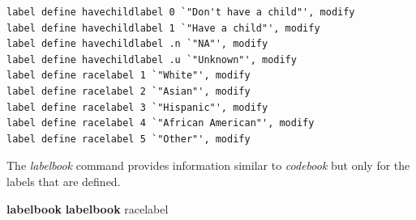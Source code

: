 \documentclass[
]{book}
\newenvironment{Shaded}{\begin{snugshade}}{\end{snugshade}}
\newcommand{\KeywordTok}[1]{\textcolor[rgb]{0.13,0.29,0.53}{\textbf{#1}}}
\newcommand{\NormalTok}[1]{#1}
\begin{document}
\begin{verbatim}
label define havechildlabel 0 `"Don't have a child"', modify
label define havechildlabel 1 `"Have a child"', modify
label define havechildlabel .n `"NA"', modify
label define havechildlabel .u `"Unknown"', modify
label define racelabel 1 `"White"', modify
label define racelabel 2 `"Asian"', modify
label define racelabel 3 `"Hispanic"', modify
label define racelabel 4 `"African American"', modify
label define racelabel 5 `"Other"', modify
\end{verbatim}

The \emph{labelbook} command provides information similar to \emph{codebook} but only for the labels that are defined.

\begin{Shaded}
\begin{Highlighting}[]
\KeywordTok{labelbook}
\KeywordTok{labelbook}\NormalTok{ racelabel}
\end{Highlighting}
\end{Shaded}
\end{document}
